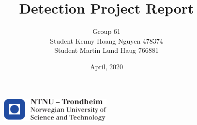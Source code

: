\documentclass[11pt, a4paper, USenglish]{article} %
\begin{document}
\title{Detection Project Report}
\author{Group 61\\Student Kenny Hoang Nguyen 478374\\Student Martin Lund Haug 766881\\}
\date{April, 2020}
\begin{titlepage}
    \maketitle
    \begin{figure}
    \centering
    \includegraphics[width=0.5\textwidth]{figures/logontnu_eng.pdf}\\
    \end{figure}
    \thispagestyle{empty}
\end{titlepage}

\newpage

\thispagestyle{empty} %

\newpage
\tableofcontents
\thispagestyle{empty} %

\newpage
\setcounter{page}{1}






\newpage
{}
\printbibliography{}
\label{sec:bibliography}


\end{document}
